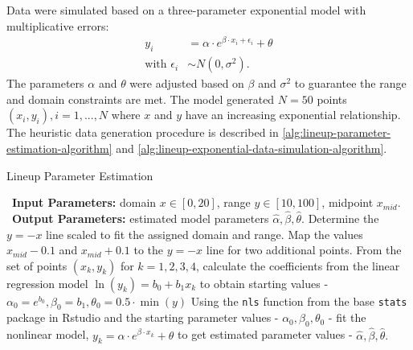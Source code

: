 \documentclass[12pt]{article}
\begin{document}
Data were simulated based on a three-parameter exponential model with
multiplicative errors: \begin{align}
y_i & = \alpha\cdot e^{\beta\cdot x_i + \epsilon_i} + \theta \\
\text{with } \epsilon_i & \sim N(0, \sigma^2). \nonumber
\end{align} The parameters \(\alpha\) and \(\theta\) were adjusted based
on \(\beta\) and \(\sigma^2\) to guarantee the range and domain
constraints are met. The model generated \(N = 50\) points
\((x_i, y_i), i = 1,...,N\) where \(x\) and \(y\) have an increasing
exponential relationship. The heuristic data generation procedure is
described in \cref{alg:lineup-parameter-estimation-algorithm} and
\cref{alg:lineup-exponential-data-simulation-algorithm}.

\begin{algorithm}
  \caption{Lineup Parameter Estimation}\label{alg:lineup-parameter-estimation-algorithm}
  \begin{algorithmic}[1]
    \Statex \textbullet~\textbf{Input Parameters:} domain $x\in[0,20]$, range $y\in[10,100]$, midpoint $x_{mid}$.
    \Statex \textbullet~\textbf{Output Parameters:} estimated model parameters $\hat\alpha, \hat\beta, \hat\theta$.
    \State Determine the $y=-x$ line scaled to fit the assigned domain and range.
    \State Map the values $x_{mid} - 0.1$ and $x_{mid} + 0.1$ to the $y=-x$ line for two additional points.
    \State From the set of points $(x_k, y_k)$ for $k = 1,2,3,4$, calculate the coefficients from the linear regression model $\ln(y_k) = b_0 +b_1x_k$ to obtain starting values - $\alpha_0 = e^{b_0}, \beta_0 =  b_1, \theta_0 = 0.5\cdot \min(y)$
    \State Using the \texttt{nls} function from the base \texttt{stats} package in Rstudio and the starting parameter values - $\alpha_0, \beta_0, \theta_0$ - fit the nonlinear model, $y_k = \alpha\cdot e^{\beta\cdot x_k}+\theta$ to get estimated parameter values - $\hat\alpha, \hat\beta, \hat\theta.$
  \end{algorithmic}
\end{algorithm}
\end{document}
